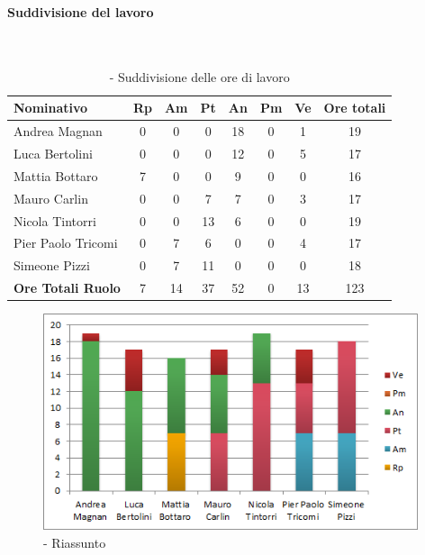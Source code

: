 \documentclass[../PianoDiProgetto.tex]{subfiles}
\begin{document}
	\subsubsection{\PerPA}
				\paragraph{Suddivisione del lavoro}\
						
	\begin{table}[H]
		\centering
	
		\begin{tabularx}{\textwidth}{l  * {6}{c}  c}
			\toprule
			\textbf{Nominativo} & \textbf{Rp} & \textbf{Am} & \textbf{Pt} 
						& \textbf{An} & \textbf{Pm} & \textbf{Ve} & \textbf{Ore totali} \\
			\midrule
			Andrea Magnan  & 0 & 0 & 0 & 18 & 0 & 1 & 19 \\
			Luca Bertolini  & 0 & 0 & 0 & 12 & 0 & 5 & 17 \\
			Mattia Bottaro  & 7 & 0 & 0 & 9 & 0 & 0 & 16 \\
			Mauro Carlin  & 0 & 0 & 7 & 7 & 0 & 3 & 17 \\
			Nicola Tintorri  & 0 & 0 & 13 & 6 & 0 & 0 & 19 \\
			Pier Paolo Tricomi  & 0 & 7 & 6 & 0 & 0 & 4 & 17 \\
			Simeone Pizzi & 0 & 7 & 11 & 0 & 0 & 0 & 18 \\
			\midrule
			\textbf{Ore Totali Ruolo} & 7 & 14 & 37 & 52 & 0 & 13 & 123 \\
			\bottomrule
		\end{tabularx}
		\caption{\PerPA{} - Suddivisione delle ore di lavoro}
	\end{table}
\vfill	
	
	\begin{figure}[H]
		\centering
		\includegraphics[width=11cm, trim=1cm 0cm 1cm 0cm]{grafici/PA-persona}
			\caption{\PerPA{} - Riassunto}
	\end{figure}
\vfill	
\newpage
	
\end{document}
